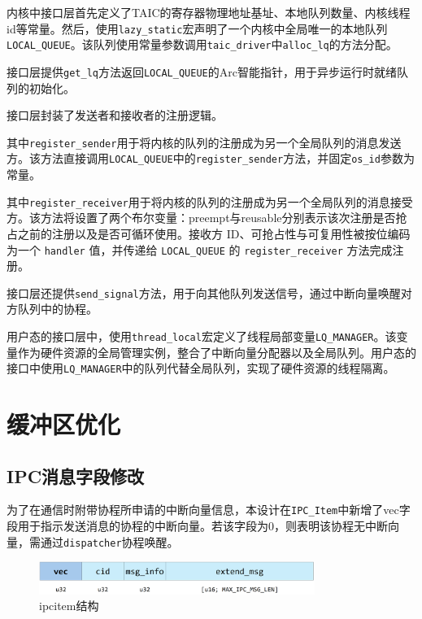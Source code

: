 内核中接口层首先定义了TAIC的寄存器物理地址基址、本地队列数量、内核线程id等常量。然后，使用\texttt{lazy\_static}宏声明了一个内核中全局唯一的本地队列\texttt{LOCAL\_QUEUE}。该队列使用常量参数调用\texttt{taic\_driver}中\texttt{alloc\_lq}的方法分配。

接口层提供\texttt{get\_lq}方法返回\texttt{LOCAL\_QUEUE}的Arc智能指针，用于异步运行时就绪队列的初始化。

接口层封装了发送者和接收者的注册逻辑。

其中\texttt{register\_sender}用于将内核的队列的注册成为另一个全局队列的消息发送方。该方法直接调用\texttt{LOCAL\_QUEUE}中的\texttt{register\_sender}方法，并固定\texttt{os\_id}参数为常量。

其中\texttt{register\_receiver}用于将内核的队列的注册成为另一个全局队列的消息接受方。该方法将设置了两个布尔变量：preempt与reusable分别表示该次注册是否抢占之前的注册以及是否可循环使用。接收方 ID、可抢占性与可复用性被按位编码为一个 \texttt{handler} 值，并传递给 \texttt{LOCAL\_QUEUE} 的 \texttt{register\_receiver} 方法完成注册。

接口层还提供\texttt{send\_signal}方法，用于向其他队列发送信号，通过中断向量唤醒对方队列中的协程。

用户态的接口层中，使用\texttt{thread\_local}宏定义了线程局部变量\texttt{LQ\_MANAGER}。该变量作为硬件资源的全局管理实例，整合了中断向量分配器以及全局队列。用户态的接口中使用\texttt{LQ\_MANAGER}中的队列代替全局队列，实现了硬件资源的线程隔离。

\section{缓冲区优化}

\subsection{IPC消息字段修改}

为了在通信时附带协程所申请的中断向量信息，本设计在\texttt{IPC\_Item}中新增了vec字段用于指示发送消息的协程的中断向量。若该字段为0，则表明该协程无中断向量，需通过\texttt{dispatcher}协程唤醒。

\begin{figure}[htbp]
  \centering
  \includegraphics[width=0.8\textwidth]{images/ipc_item.png}
  \caption{ipcitem结构}\label{ipc_item结构}
\end{figure}

